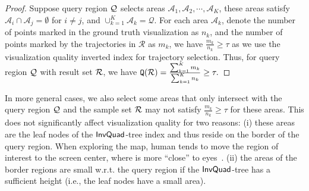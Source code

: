 \begin{proof}
Suppose query region $\mathcal{Q}$ selects areas $\mathcal{A}_1,\!\mathcal{A}_2,\!\cdots,\!\mathcal{A}_K$,
these areas satisfy $\mathcal{A}_i \cap \mathcal{A}_j = \emptyset$ for $i\neq j$, and $\cup_{k=1}^{K}\mathcal{A}_k=\mathcal{Q}$.
For each area $\mathcal{A}_k$, denote the number of points marked in the ground truth visualization as $n_k$,
and the number of points marked by the trajectories in $\mathcal{R}$ as $m_k$,
we have $\frac{m_k}{n_k} \ge \tau$ as we use the visualization quality inverted index for trajectory selection.
Thus, for query region $\mathcal{Q}$ with result set $\mathcal{R}$, we have
$\mathtt{Q}(\mathcal{R}) = \frac{\sum_{k=1}^{K} m_k}{\sum_{k=1}^{K} n_k} \ge \tau.$
\end{proof}
In more general cases, we also select some areas that only intersect with the query region $\mathcal{Q}$ and the sample set $\mathcal{R}$ may not satisfy $\frac{m_k}{n_k}\ge \tau$ for these areas.
This does not significantly affect visualization quality for two reasons:
(i) these areas are the leaf nodes of the $\mathsf{InvQuad}$-tree index and thus reside on the border of the query region.
When exploring the map, human tends to move the region of interest to the screen center, where is more ``close'' to eyes~\cite{fitts_click}. %
(ii) the areas of the border regions are small w.r.t. the query region if the $\mathsf{InvQuad}$-tree has a sufficient height (i.e., the leaf nodes have a small area).






